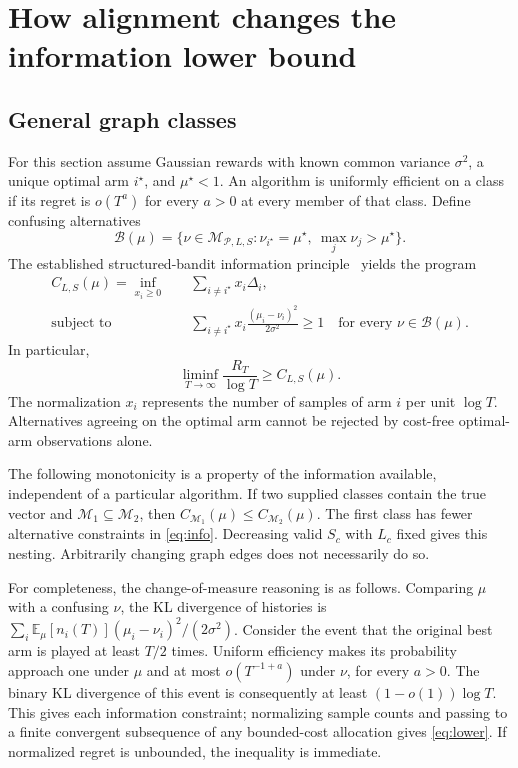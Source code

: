 \documentclass[11pt]{article}
\newcommand{\E}{\mathbb E}
\begin{document}
\section{How alignment changes the information lower bound}
\subsection{General graph classes}
For this section assume Gaussian rewards with known common variance $\sigma^2$, a unique optimal arm $i^\star$, and $\mu^\star<1$. An algorithm is uniformly efficient on a class if its regret is $o(T^a)$ for every $a>0$ at every member of that class. Define confusing alternatives
\begin{equation}
 \mathcal B(\mu)=\{\nu\in\mathcal M_{\mathcal P,L,S}:
       \nu_{i^\star}=\mu^\star,\ \max_j\nu_j>\mu^\star\}.
\end{equation}
The established structured-bandit information principle~\cite{combes2017} yields the program
\begin{align}
 C_{L,S}(\mu)=\inf_{x_i\ge0}\quad&\sum_{i\ne i^\star}x_i\Delta_i,\label{eq:info}\\
 \text{subject to}\quad&
 \sum_{i\ne i^\star}x_i\frac{(\mu_i-\nu_i)^2}{2\sigma^2}\ge1
       \quad\text{for every }\nu\in\mathcal B(\mu).\nonumber
\end{align}
In particular,
\begin{equation}
 \liminf_{T\to\infty}\frac{R_T}{\log T}\ge C_{L,S}(\mu).
 \label{eq:lower}
\end{equation}
The normalization $x_i$ represents the number of samples of arm $i$ per unit $\log T$. Alternatives agreeing on the optimal arm cannot be rejected by cost-free optimal-arm observations alone.

The following monotonicity is a property of the information available, independent of a particular algorithm. If two supplied classes contain the true vector and
$\mathcal M_1\subseteq\mathcal M_2$, then $C_{\mathcal M_1}(\mu)\le C_{\mathcal M_2}(\mu)$. The first class has fewer alternative constraints in \eqref{eq:info}. Decreasing valid $S_c$ with $L_c$ fixed gives this nesting. Arbitrarily changing graph edges does not necessarily do so.

For completeness, the change-of-measure reasoning is as follows. Comparing $\mu$ with a confusing $\nu$, the KL divergence of histories is
$\sum_i\E_\mu[n_i(T)](\mu_i-\nu_i)^2/(2\sigma^2)$.
Consider the event that the original best arm is played at least $T/2$ times. Uniform efficiency makes its probability approach one under $\mu$ and at most $o(T^{-1+a})$ under $\nu$, for every $a>0$. The binary KL divergence of this event is consequently at least $(1-o(1))\log T$. This gives each information constraint; normalizing sample counts and passing to a finite convergent subsequence of any bounded-cost allocation gives \eqref{eq:lower}. If normalized regret is unbounded, the inequality is immediate.
\end{document}
